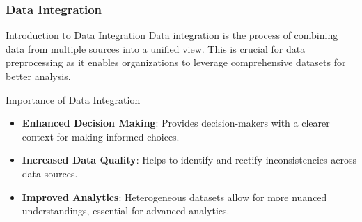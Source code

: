 \documentclass[aspectratio=169]{beamer}
\begin{document}
\begin{frame}[fragile]
    \frametitle{Data Integration}
    \begin{block}{Introduction to Data Integration}
        Data integration is the process of combining data from multiple sources into a unified view. This is crucial for data preprocessing as it enables organizations to leverage comprehensive datasets for better analysis.
    \end{block}
    \begin{block}{Importance of Data Integration}
        \begin{itemize}
            \item \textbf{Enhanced Decision Making}: Provides decision-makers with a clearer context for making informed choices.
            \item \textbf{Increased Data Quality}: Helps to identify and rectify inconsistencies across data sources.
            \item \textbf{Improved Analytics}: Heterogeneous datasets allow for more nuanced understandings, essential for advanced analytics.
        \end{itemize}
    \end{block}
\end{frame}
\end{document}
